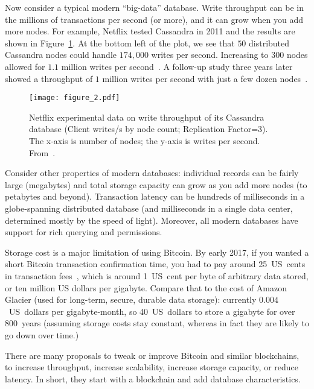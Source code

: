 \documentclass[a4paper]{article}
\begin{document}
Now consider a typical modern ``big-data'' database.
Write throughput can be in the millions of transactions per second (or more),
and it can grow when you add more nodes.
For example, Netflix tested Cassandra in 2011 and the results
are shown in Figure~\ref{fig:cassandra_throughput}.
At the bottom left of the plot, we see that $50$ distributed Cassandra nodes could handle $174,000$ writes per second.
Increasing to $300$ nodes allowed for $1.1$ million writes per second~\cite{cockcroft2011benchmarking}.
A follow-up study three years later showed a throughput of $1$ million writes per second with just a few dozen nodes~\cite{kalantzis_netflix}.


\begin{figure}[!ht]
  \centering
  \texttt{[image: figure\_2.pdf]}
  \caption{Netflix experimental data on write throughput of its Cassandra database (Client writes/s by node count; Replication Factor=$3$).
  The x-axis is number of nodes; the y-axis is writes per second.
  From~\cite{cockcroft2011benchmarking}.}
  \label{fig:cassandra_throughput}
\end{figure}


Consider other properties of modern databases:
individual records can be fairly large (megabytes)
and total storage capacity can grow as you add more nodes
(to petabytes and beyond).
Transaction latency can be hundreds of milliseconds
in a globe-spanning distributed database
(and milliseconds in a single data center,
determined mostly by the speed of light).
Moreover, all modern databases have support
for rich querying and permissions.

Storage cost is a major limitation of using Bitcoin.
By early 2017,
if you wanted a short Bitcoin transaction confirmation time,
you had to pay around 25~US~cents
in transaction fees~\cite{bitcoin_tx_fees_2017},
which is around 1~US~cent
per byte of arbitrary data stored,
or ten million US dollars per gigabyte.
Compare that to the cost of Amazon Glacier (used
for long-term, secure, durable data storage):
currently $0.004$~US~dollars per gigabyte-month,
so 40~US~dollars to store a gigabyte for over 800~years
(assuming storage costs stay constant,
whereas in fact they are likely to go down over time.)

There are many proposals to tweak or improve Bitcoin and similar blockchains,
to increase throughput, increase scalability, increase storage capacity, or reduce latency.
In short, they start with a blockchain and add database characteristics.
\end{document}
